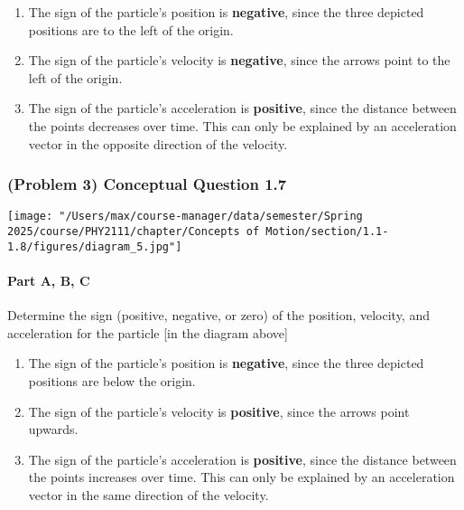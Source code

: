 \vspace{1em}

\begin{solution}
	\begin{enumerate}
		\item The sign of the particle's position is \textbf{negative}, since the three depicted positions are to the left of the origin.
		\item The sign of the particle's velocity is \textbf{negative}, since the arrows point to the left of the origin.
		\item The sign of the particle's acceleration is \textbf{positive}, since the distance between the points decreases over time. This can only be explained by an acceleration vector in the opposite direction of the velocity.
	\end{enumerate}
\end{solution}

\newpage

\subsubsection{(Problem 3) Conceptual Question 1.7}

\begin{center}
	\texttt{[image: "/Users/max/course-manager/data/semester/Spring 2025/course/PHY2111/chapter/Concepts of Motion/section/1.1-1.8/figures/diagram\_5.jpg"]}
\end{center}

\paragraph{Part A, B, C}
Determine the sign (positive, negative, or zero) of the position, velocity, and acceleration for the particle [in the diagram above]

\vspace{1em}

\begin{solution}
	\begin{enumerate}
		\item The sign of the particle's position is \textbf{negative}, since the three depicted positions are below the origin.
		\item The sign of the particle's velocity is \textbf{positive}, since the arrows point upwards.
		\item The sign of the particle's acceleration is \textbf{positive}, since the distance between the points increases over time. This can only be explained by an acceleration vector in the same direction of the velocity.
	\end{enumerate}
\end{solution}

